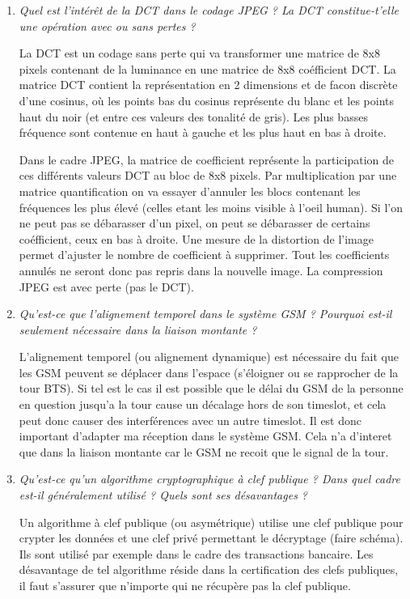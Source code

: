 \documentclass[a4paper, 11pt]{article}
\begin{document}
\begin{enumerate}
\item \textit{Quel est l'intérêt de la DCT dans le codage JPEG ? La DCT constitue-t'elle une opération avec ou sans pertes ?}

La DCT est un codage sans perte qui va transformer une matrice de 8x8 pixels contenant de la luminance en une matrice de 8x8 coéfficient DCT. La matrice DCT contient la représentation en 2 dimensions et de facon discrète d'une cosinus, où les points bas du cosinus représente du blanc et les points haut du noir (et entre ces valeurs des tonalité de gris). Les plus basses fréquence sont contenue en haut à gauche et les plus haut en bas à droite.

Dans le cadre JPEG, la matrice de coefficient représente la participation de ces différents valeurs DCT au bloc de 8x8 pixels. Par multiplication par une matrice quantification on va essayer d'annuler les blocs contenant les fréquences les plus élevé (celles etant les moins visible à l'oeil human). Si l'on ne peut pas se débarasser d'un pixel, on peut se débarasser de certains coéfficient, ceux en bas à droite. Une mesure de la distortion de l'image permet d'ajuster le nombre de coefficient à supprimer. Tout les coefficients annulés ne seront donc pas repris dans la nouvelle image. La compression JPEG est avec perte (pas le DCT). 

\item \textit{Qu'est-ce que l'alignement temporel dans le système GSM ? Pourquoi est-il seulement nécessaire dans la liaison montante ?}

L'alignement temporel (ou alignement dynamique) est nécessaire du fait que les GSM peuvent se déplacer dans l'espace (s'éloigner ou se rapprocher de la tour BTS). Si tel est le cas il est possible que le délai du GSM de la personne en question jusqu'a la tour cause un décalage hors de son timeslot, et cela peut donc causer des interférences avec un autre timeslot. Il est donc important d'adapter ma réception dans le système GSM. Cela n'a d'interet que dans la liaison montante car le GSM ne recoit que le signal de la tour. 

\item \textit{Qu'est-ce qu'un algorithme cryptographique à clef publique ? Dans quel
cadre est-il généralement utilisé ? Quels sont ses désavantages ?}

Un algorithme à clef publique (ou asymétrique) utilise une clef publique pour crypter les données et une clef privé permettant le décryptage (faire schéma). Ils sont utilisé par exemple dans le cadre des transactions bancaire. Les désavantage de tel algorithme réside dans la certification des clefs publiques, il faut s'assurer que n'importe qui ne récupère pas la clef publique.

\end{enumerate}
\end{document}
